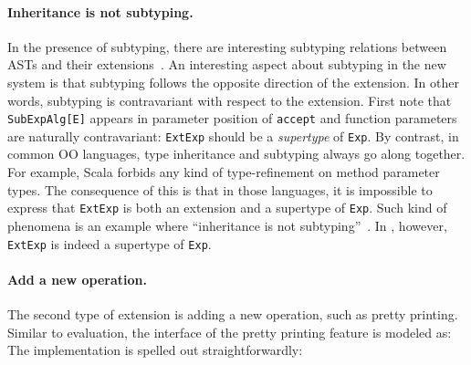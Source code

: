 \paragraph{Inheritance is not subtyping.} In the presence of subtyping, there
are interesting subtyping relations between ASTs and their
extensions~\cite{oliveira09modular}. An interesting aspect about subtyping in
the new system is that subtyping follows the opposite direction of the
extension. In other words, subtyping is contravariant with respect to the
extension. First note that \lstinline{SubExpAlg[E]} appears in parameter
position of \lstinline{accept} and function parameters are naturally
contravariant: \lstinline{ExtExp} should be a \textit{supertype} of
\lstinline{Exp}. By contrast, in common OO languages, type inheritance and
subtyping always go along together. For example, Scala forbids any kind of
type-refinement on method parameter types. The consequence of this is that in
those languages, it is impossible to express that \lstinline{ExtExp} is both an
extension and a supertype of \lstinline{Exp}. Such kind of phenomena is an
example where ``inheritance is not
subtyping''~\cite{cook1989inheritance}. In \name, however,
\lstinline{ExtExp} is indeed a supertype of \lstinline{Exp}.

\paragraph{Add a new operation.} The second type of extension is adding a new
operation, such as pretty printing. Similar to evaluation, the interface of the
pretty printing feature is modeled as:
The implementation is spelled out straightforwardly:

